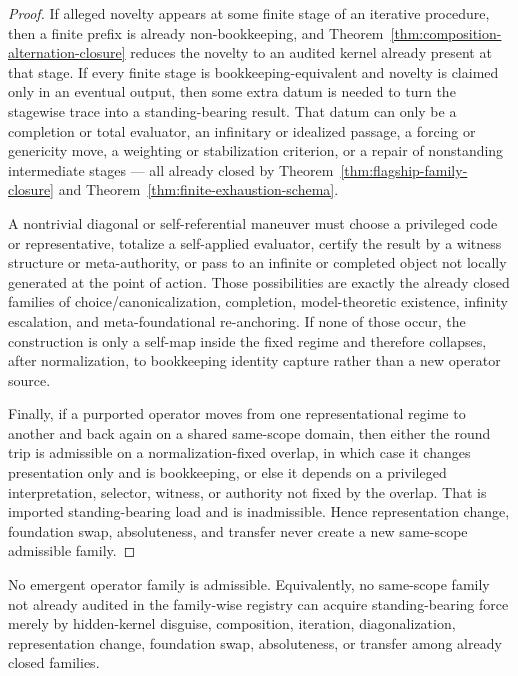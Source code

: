 \begin{proof}
If alleged novelty appears at some finite stage of an iterative procedure, then a finite prefix is already non-bookkeeping, and Theorem~\ref{thm:composition-alternation-closure} reduces the novelty to an audited kernel already present at that stage. If every finite stage is bookkeeping-equivalent and novelty is claimed only in an eventual output, then some extra datum is needed to turn the stagewise trace into a standing-bearing result. That datum can only be a completion or total evaluator, an infinitary or idealized passage, a forcing or genericity move, a weighting or stabilization criterion, or a repair of nonstanding intermediate stages --- all already closed by Theorem~\ref{thm:flagship-family-closure} and Theorem~\ref{thm:finite-exhaustion-schema}.

A nontrivial diagonal or self-referential maneuver must choose a privileged code or representative, totalize a self-applied evaluator, certify the result by a witness structure or meta-authority, or pass to an infinite or completed object not locally generated at the point of action. Those possibilities are exactly the already closed families of choice/canonicalization, completion, model-theoretic existence, infinity escalation, and meta-foundational re-anchoring. If none of those occur, the construction is only a self-map inside the fixed regime and therefore collapses, after normalization, to bookkeeping identity capture rather than a new operator source.

Finally, if a purported operator moves from one representational regime to another and back again on a shared same-scope domain, then either the round trip is admissible on a normalization-fixed overlap, in which case it changes presentation only and is bookkeeping, or else it depends on a privileged interpretation, selector, witness, or authority not fixed by the overlap. That is imported standing-bearing load and is inadmissible. Hence representation change, foundation swap, absoluteness, and transfer never create a new same-scope admissible family.
\end{proof}

\begin{theorem}
\label{thm:no-emergent-family}
No emergent operator family is admissible. Equivalently, no same-scope family not already audited in the family-wise registry can acquire standing-bearing force merely by hidden-kernel disguise, composition, iteration, diagonalization, representation change, foundation swap, absoluteness, or transfer among already closed families.
\end{theorem}

